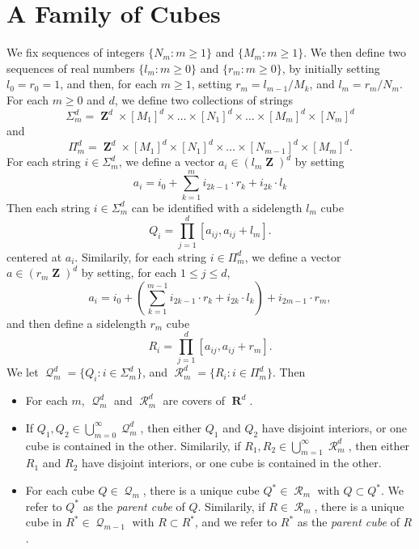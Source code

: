 \documentclass[12pt,reqno]{amsart}
\DeclareMathOperator{\RR}{\mathbf{R}}
\DeclareMathOperator{\ZZ}{\mathbf{Z}}
\DeclareMathOperator{\DQ}{\mathcal{Q}}
\DeclareMathOperator{\DR}{\mathcal{R}}
\begin{document}
\section{A Family of Cubes}

We fix sequences of integers $\{ N_m : m \geq 1 \}$ and $\{ M_m : m \geq 1 \}$. We then define two sequences of real numbers $\{ l_m : m \geq 0 \}$ and $\{ r_m : m \geq 0 \}$, by initially setting $l_0 = r_0 = 1$, and then, for each $m \geq 1$, setting $r_m = l_{m-1}/M_k$, and $l_m = r_m/N_m$. For each $m \geq 0$ and $d$, we define two collections of strings
%
\[ \Sigma_m^d = \ZZ^d \times [M_1]^d \times \dots \times [N_1]^d \times \dots \times [M_m]^d \times [N_m]^d \]
%
and
%
\[ \Pi_m^d = \ZZ^d \times [M_1]^d \times [N_1]^d \times \dots \times [N_{m-1}]^d \times [M_m]^d. \]
%
For each string $i \in \Sigma_m^d$, we define a vector $a_i \in (l_m \ZZ)^d$ by setting
%
\[ a_i = i_0 + \sum_{k = 1}^m i_{2k-1} \cdot r_k + i_{2k} \cdot l_k \]
%
Then each string $i \in \Sigma_m^d$ can be identified with a sidelength $l_m$ cube
%
\[ Q_i = \prod_{j = 1}^d \left[ a_{ij}, a_{ij} + l_m \right]. \]
%
centered at $a_i$. Similarily, for each string $i \in \Pi_m^d$, we define a vector $a \in (r_m \ZZ)^d$ by setting, for each $1 \leq j \leq d$,
%
\[ a_i = i_0 + \left( \sum_{k = 1}^{m-1} i_{2k-1} \cdot r_k + i_{2k} \cdot l_k \right) + i_{2m-1} \cdot r_m, \]
%
and then define a sidelength $r_m$ cube
%
\[ R_i = \prod_{j = 1}^d \left[ a_{ij}, a_{ij} + r_m \right]. \]
%
We let $\DQ_m^d = \{ Q_i : i \in \Sigma_m^d \}$, and $\DR_m^d = \{ R_i : i \in \Pi_m^d \}$. Then
%
\begin{itemize}
	\item For each $m$, $\DQ_m^d$ and $\DR_m^d$ are covers of $\RR^d$.

	\item If $Q_1,Q_2 \in \bigcup_{m = 0}^\infty \DQ_m^d$, then either $Q_1$ and $Q_2$ have disjoint interiors, or one cube is contained in the other. Similarily, if $R_1,R_2 \in \bigcup_{m = 1}^\infty \DR_m^d$, then either $R_1$ and $R_2$ have disjoint interiors, or one cube is contained in the other.

	\item For each cube $Q \in \DQ_m$, there is a unique cube $Q^* \in \DR_m$ with $Q \subset Q^*$. We refer to $Q^*$ as the \emph{parent cube} of $Q$. Similarily, if $R \in \DR_m$, there is a unique cube in $R^* \in \DQ_{m-1}$ with $R \subset R^*$, and we refer to $R^*$ as the \emph{parent cube} of $R$.
\end{itemize}
\end{document}
